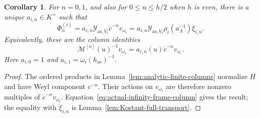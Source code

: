 \documentclass[11pt,leqno]{amsart}
\numberwithin{equation}{section}
\theoremstyle{plain}
\newtheorem{corollary}[theorem]{Corollary}
\theoremstyle{definition}
\theoremstyle{plain}
\theoremstyle{definition}
\theoremstyle{remark}
\begin{document}
\begin{corollary}\label{cor:analytic-rotated-columns}\label{lem:actual-cyclic-column-comparison}\label{lem:infinity-normalized-columns}
For $n=0,1$, and also for $0\le n\le h/2$ when $h$ is even, there is a unique $a_{i,n}\in K^\times$ such that
\[
 \Phi_n^{(i)}
 =a_{i,n}\mathcal Y_{\mathrm{as},V_i}\dot c^{-n}v_{\omega_i}
 =a_{i,n}\mathcal Y_{\mathrm{as},V_i}
            \rho_i(a_\Lambda^{-1})\xi_{i,n}.
\]
Equivalently, these are the column identities
\begin{equation}\label{eq:infinity-normalized-columns}
 \mathscr M^{[n]}(u)^{-1}v_{\omega_i}=a_{i,n}(u)\dot c^{-n}v_{\omega_i}.
\end{equation}
Here $a_{i,0}=1$ and $a_{i,1}=\omega_i(h_{\mathrm{as}})^{-1}$.
\end{corollary}
\begin{proof}
The ordered products in Lemma~\ref{lem:analytic-finite-columns} normalize $H$ and have Weyl component $c^{-n}$.  Their actions on $v_{\omega_i}$ are therefore nonzero multiples of $\dot c^{-n}v_{\omega_i}$.  Equation~\eqref{eq:actual-infinity-frame-column} gives the result; the equality with $\xi_{i,n}$ is Lemma~\ref{lem:Kostant-full-transport}.
\end{proof}
\end{document}

